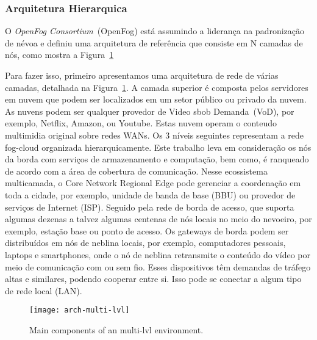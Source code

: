 \subsubsection{Arquitetura Hierarquica}

O \textit{OpenFog Consortium}~(OpenFog) está assumindo a liderança na padronização de névoa e definiu uma arquitetura de referência que consiste em N camadas de nós, como mostra a Figura~\ref{fig:arch-multi-lvl}

Para fazer isso, primeiro apresentamos uma arquitetura de rede de várias camadas, detalhada na Figura~\ref{fig:arch-multi-lvl}. A camada superior é composta pelos servidores em nuvem que podem ser localizados em um setor público ou privado da nuvem. As nuvens podem ser qualquer provedor de Video sbob Demanda~(VoD), por exemplo, Netflix, Amazon, ou Youtube. Estas nuvem operam o conteudo multimidia original sobre redes WANs. Os 3 níveis seguintes representam a rede fog-cloud organizada hierarquicamente. Este  trabalho leva em consideração os nós da borda com serviços de armazenamento e computação, bem como, é ranqueado de acordo com a área de cobertura de comunicação. Nesse ecossistema multicamada, o Core Network Regional Edge pode gerenciar a coordenação em toda a cidade, por exemplo, unidade de banda de base (BBU) ou provedor de serviços de Internet (ISP). Seguido pela rede de borda de acesso, que suporta algumas dezenas a talvez algumas centenas de nós locais no meio do nevoeiro, por exemplo, estação base ou ponto de acesso. Os gateways de borda podem ser distribuídos em nós de neblina locais, por exemplo, computadores pessoais, laptops e smartphones, onde o nó de neblina retransmite o conteúdo do vídeo por meio de comunicação com ou sem fio. Esses dispositivos têm demandas de tráfego altas e similares, podendo cooperar entre si. Isso pode se conectar a algum tipo de rede local (LAN).

\begin{figure}[htb]
  \centering
  \texttt{[image: arch-multi-lvl]}
  \caption{Main components of an multi-lvl environment.}
  \label{fig:arch-multi-lvl}
\end{figure}

